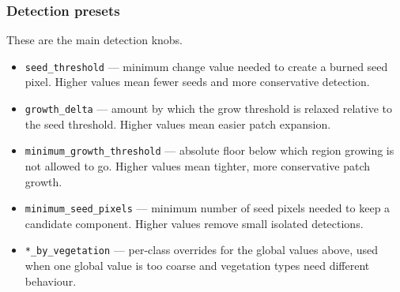 \documentclass[
  british,
  a4paper,
]{scrbook}
\providecommand{\tightlist}{%
  \setlength{\itemsep}{0pt}\setlength{\parskip}{0pt}}
\begin{document}
\subsubsection{Detection presets}\label{detection-presets}

These are the main detection knobs.

\begin{itemize}
\tightlist
\item
  \texttt{seed\_threshold} --- minimum change value needed to create a
  burned seed pixel. Higher values mean fewer seeds and more
  conservative detection.
\item
  \texttt{growth\_delta} --- amount by which the grow threshold is
  relaxed relative to the seed threshold. Higher values mean easier
  patch expansion.
\item
  \texttt{minimum\_growth\_threshold} --- absolute floor below which
  region growing is not allowed to go. Higher values mean tighter, more
  conservative patch growth.
\item
  \texttt{minimum\_seed\_pixels} --- minimum number of seed pixels
  needed to keep a candidate component. Higher values remove small
  isolated detections.
\item
  \texttt{*\_by\_vegetation} --- per-class overrides for the global
  values above, used when one global value is too coarse and vegetation
  types need different behaviour.
\end{itemize}
\end{document}
